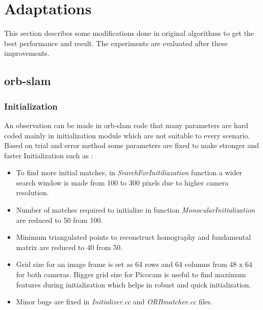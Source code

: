 \section{Adaptations}
This section describes some modifications done in original algorithms to get the best performance and result. The experiments are evaluated after these improvements. 

\subsection{\acrshort{orb}-\acrshort{slam}}

\subsubsection{Initialization}
An observation can be made in \acrshort{orb}-\acrshort{slam} code that many parameters are hard coded mainly in initialization module which are not suitable to every scenario. Based on trial and error method some parameters are fixed to make stronger and faster Initialization such as :
\begin{itemize} 
   	\item To find more initial matches, in \textit{SearchForInitiliazation} function  a wider search window is made from 100 to 300 pixels due to higher camera resolution.
	\item Number of matches required to initialize in function \textit{MonocularInitialization} are reduced to 50 from 100.
 	\item Minimum triangulated points to reconstruct homography and fundamental matrix are reduced to 40 from 50. 
 	\item Grid size for an image frame is set as 64 rows and 64 columns from 48 x 64 for both cameras. Bigger grid size for Picocam is useful to find maximum features during initialization which helps in robust and quick initialization. 
	\item Minor bugs are fixed in \textit{Initializer.cc} and \textit{ORBmatcher.cc} files.
\end{itemize}

